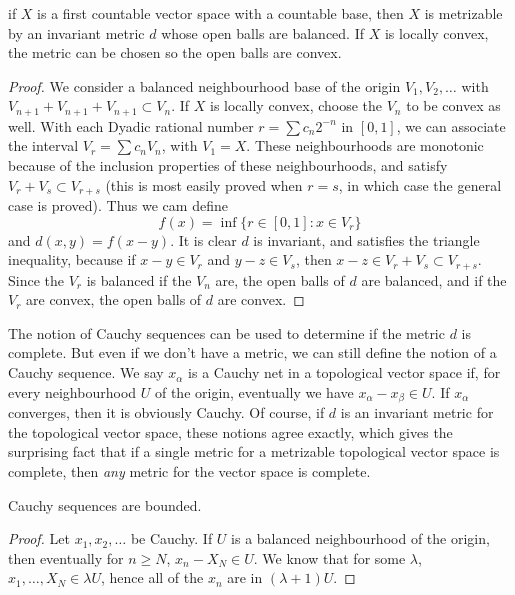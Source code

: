 \begin{theorem}
    if $X$ is a first countable vector space with a countable base, then $X$ is metrizable by an invariant metric $d$ whose open balls are balanced. If $X$ is locally convex, the metric can be chosen so the open balls are convex.
\end{theorem}
\begin{proof}
    We consider a balanced neighbourhood base of the origin $V_1, V_2, \dots$ with $V_{n+1} + V_{n+1} + V_{n+1} \subset V_n$. If $X$ is locally convex, choose the $V_n$ to be convex as well. With each Dyadic rational number $r = \sum c_n 2^{-n}$ in $[0,1]$, we can associate the interval $V_r = \sum c_n V_n$, with $V_1 = X$. These neighbourhoods are monotonic because of the inclusion properties of these neighbourhoods, and satisfy $V_r + V_s \subset V_{r+s}$ (this is most easily proved when $r = s$, in which case the general case is proved). Thus we cam define
    \[ f(x) = \inf \{ r \in [0,1] : x \in V_r \} \]
    and $d(x,y) = f(x-y)$. It is clear $d$ is invariant, and satisfies the triangle inequality, because if $x - y \in V_r$ and $y - z \in V_s$, then $x - z \in V_r + V_s \subset V_{r + s}$. Since the $V_r$ is balanced if the $V_n$ are, the open balls of $d$ are balanced, and if the $V_r$ are convex, the open balls of $d$ are convex.
\end{proof}

The notion of Cauchy sequences can be used to determine if the metric $d$ is complete. But even if we don't have a metric, we can still define the notion of a Cauchy sequence. We say $x_\alpha$ is a Cauchy net in a topological vector space if, for every neighbourhood $U$ of the origin, eventually we have $x_\alpha - x_\beta \in U$. If $x_\alpha$ converges, then it is obviously Cauchy. Of course, if $d$ is an invariant metric for the topological vector space, these notions agree exactly, which gives the surprising fact that if a single metric for a metrizable topological vector space is complete, then {\it any} metric for the vector space is complete.

\begin{theorem}
    Cauchy sequences are bounded.
\end{theorem}
\begin{proof}
    Let $x_1, x_2, \dots$ be Cauchy. If $U$ is a balanced neighbourhood of the origin, then eventually for $n \geq N$, $x_n - X_N \in U$. We know that for some $\lambda$, $x_1, \dots, X_N \in \lambda U$, hence all of the $x_n$ are in $(\lambda + 1)U$.
\end{proof}

